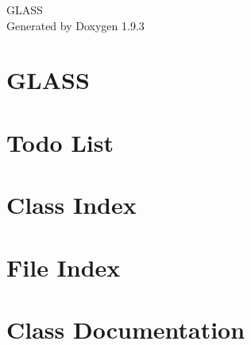 \documentclass[twoside]{book}
\newcommand{\+}{\discretionary{\mbox{\scriptsize$\hookleftarrow$}}{}{}}
\newcommand{\clearemptydoublepage}{%
    \newpage{\pagestyle{empty}\cleardoublepage}%
  }
\begin{document}
  \raggedbottom
    \hypersetup{pageanchor=false,
                bookmarksnumbered=true,
                pdfencoding=unicode
               }
  \begin{titlepage}
  \vspace*{7cm}
  \begin{center}%
  {\Large GLASS}\\
  \vspace*{1cm}
  {\large Generated by Doxygen 1.9.3}\\
  \end{center}
  \end{titlepage}
  \clearemptydoublepage
  \tableofcontents
  \clearemptydoublepage
  \hypersetup{pageanchor=true}
\chapter{GLASS}
\label{index}\hypertarget{index}{}
\chapter{Todo List}
\label{todo}

\chapter{Class Index}

\chapter{File Index}

\chapter{Class Documentation}


























\end{document}
